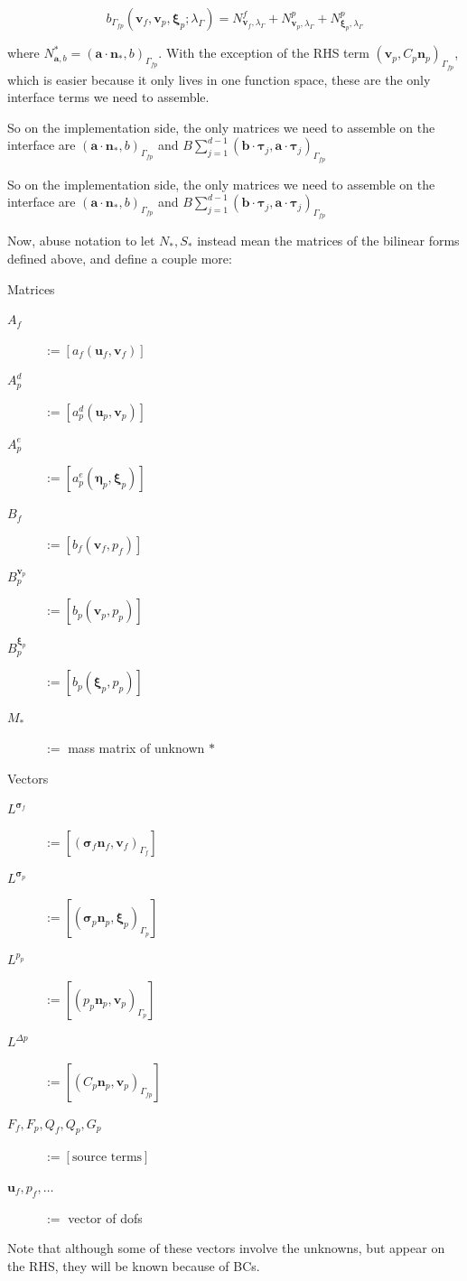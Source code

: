 \documentclass{article}
\newcommand{\mathspace}[1]{\ensuremath{#1}\xspace} %
\newcommand{\sigmabf}{\mathspace{\boldsymbol{\sigma}}}
\newcommand{\inner}[2]{\mathspace{\left (#1, #2 \right)}}
\newcommand{\defeq}{\mathspace{:=}}
\newcommand{\matrixform}[1]{\mathspace{\left [ #1 \right ]}}
\newcommand{\taubf}{\mathspace{\boldsymbol{\tau}}}
\newcommand{\stokesbdy}{\mathspace{\Gamma_{f}}}
\newcommand{\darcybdy}{\mathspace{\Gamma_{p}}}
\newcommand{\interface}{\mathspace{\Gamma_{fp}}}
\newcommand{\nf}{\mathspace{\mathbf{n}_f}}
\newcommand{\np}{\mathspace{\mathbf{n}_p}}
\newcommand{\nporf}{\mathspace{\mathbf{n}_*}}
\newcommand{\uf}{\mathspace{\mathbf{u}_f}}
\newcommand{\vf}{\mathspace{\mathbf{v}_f}}
\newcommand{\up}{\mathspace{\mathbf{u}_p}}
\newcommand{\vp}{\mathspace{\mathbf{v}_p}}
\newcommand{\pf}{\mathspace{p_f}}
\newcommand{\pp}{\mathspace{p_p}}
\newcommand{\disp}{\mathspace{\boldsymbol{\eta}_p}}
\newcommand{\disptest}{\mathspace{\boldsymbol{\xi}_p}}
\newcommand{\mult}{\mathspace{\lambda_{\Gamma}}}
\begin{document}
$$b_{\interface}(\vf, \vp, \disptest; \mult) = N^f_{\vf, \mult} + N^p_{\vp, \mult} + N^p_{\disptest, \mult} $$

where $N^*_{\mathbf{a}, b} = \inner{\mathbf{a} \cdot \nporf}{b}_{\interface}$. With the exception of the RHS term $\inner{\vp}{C_p\np}_{\interface}$, which is easier because it only lives in one function space, these are the only interface terms we need to assemble.

So on the implementation side, the only matrices we need to assemble on the interface are $\inner{\mathbf{a} \cdot \nporf}{b}_{\interface}$ and  $B \sum_{j=1}^{d-1} \inner{\mathbf{b} \cdot \taubf_j}{\mathbf{a} \cdot \taubf_j}_{\interface}$

So on the implementation side, the only matrices we need to assemble on the interface are $\inner{\mathbf{a} \cdot \nporf}{b}_{\interface}$ and  $B \sum_{j=1}^{d-1} \inner{\mathbf{b} \cdot \taubf_j}{\mathbf{a} \cdot \taubf_j}_{\interface}$

Now, abuse notation to let $N_*, S_*$ instead mean the matrices of the bilinear forms defined above, and define a couple more:
\begin{center}
  \begin{multicols}{2}
    Matrices
\begin{description}
\item[$A_f$] \defeq \matrixform{a_f(\uf, \vf)}
\item[$A^d_p$]\defeq  \matrixform{a_p^d(\up, \vp)}
\item[$A^e_p$]\defeq  \matrixform{a_p^e(\disp, \disptest)}
\item[$B_f$]\defeq  \matrixform{b_f(\vf, \pf)}
\item[$B^{\vp}_p$]\defeq  \matrixform{b_p(\vp, \pp)}
\item[$B^{\disptest}_p$]\defeq  \matrixform{b_p(\disptest, \pp)}
\item[$M_*$] \defeq mass matrix of unknown $* $
\end{description}
\columnbreak
Vectors
\begin{description}
\item[$L^{\sigmabf_f}$] \defeq \matrixform{\inner{\sigmabf_f \nf}{\vf}_{\stokesbdy}}
\item[$L^{\sigmabf_p}$] \defeq \matrixform{\inner{\sigmabf_p \np}{\disptest}_{\darcybdy}}
\item[$L^{\pp}$] \defeq \matrixform{\inner{\pp \np}{\vp}_{\darcybdy}}
\item[$L^{\Delta p}$] \defeq \matrixform{\inner{C_p\np}{\vp}_{\interface}}
\item[$F_f, F_p, Q_f, Q_p, G_p$] \defeq \matrixform{\text{source terms}}
\item[$\uf, \pf, \ldots$] \defeq vector of dofs
  
\end{description}

\end{multicols}
\end{center}
Note that although some of these vectors involve the unknowns, but appear on the RHS, they will be known because of BCs.
\end{document}
